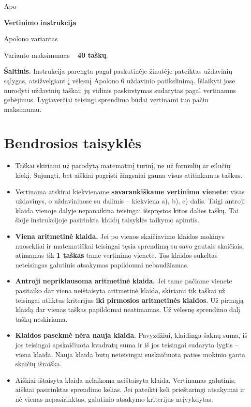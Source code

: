 Apo\documentclass[11pt,a4paper]{article}
\begin{document}
\begin{center}
{\LARGE\bfseries Vertinimo instrukcija}\par
{\large Apolono variantas}\par
Varianto maksimumas -- \textbf{40 taškų}.
\end{center}
\textbf{Šaltinis.} Instrukcija parengta pagal paskutinėje žinutėje pateiktas uždavinių sąlygas, atsižvelgiant į vėlesnį Apolono 6 uždavinio patikslinimą. Išlaikyti jose nurodyti uždavinių taškai; jų vidinis paskirstymas sudarytas pagal vertinamus gebėjimus. Lygiaverčiai teisingi sprendimo būdai vertinami tuo pačiu maksimumu.

\section*{Bendrosios taisyklės}
\begin{itemize}
\item Taškai skiriami už parodytą matematinį turinį, ne už formulių ar eilučių kiekį. Sujungti, bet aiškiai pagrįsti žingsniai gauna visus atitinkamus taškus.
\item Vertinama atskirai kiekviename \textbf{savarankiškame vertinimo vienete}: visas uždavinys, o uždaviniuose su dalimis -- kiekviena a), b), c) dalis. Taigi antroji klaida vienoje dalyje nepanaikina teisingai išspręstos kitos dalies taškų. Tai šioje instrukcijoje pasirinkta klaidų taisyklės taikymo apimtis.
\item \textbf{Viena aritmetinė klaida.} Jei po vienos skaičiavimo klaidos mokinys nuosekliai ir matematiškai teisingai tęsia sprendimą su savo gautais skaičiais, atimamas tik \textbf{1 taškas} tame vertinimo vienete. Tos klaidos sukeltas neteisingas galutinis atsakymas papildomai nebaudžiamas.
\item \textbf{Antroji nepriklausoma aritmetinė klaida.} Jei tame pačiame vienete pasitaiko dar viena neištaisyta aritmetinė klaida, skiriami tik taškai už teisingai atliktus kriterijus \textbf{iki pirmosios aritmetinės klaidos}. Už pirmąją klaidą dar vienas taškas papildomai neatimamas. Už vėlesnę sprendimo dalį taškų neskiriama.
\item \textbf{Klaidos pasekmė nėra nauja klaida.} Pavyzdžiui, klaidinga šaknų suma, iš jos teisingai apskaičiuota kvadratų suma ir iš jos teisingai sudaryta lygtis -- viena klaida. Nauja klaida būtų neteisingai suskaičiuota paties mokinio gauta skaičių išraiška.
\item Aiškiai ištaisyta klaida nelaikoma neištaisyta klaida. Vertinamas galutinis, aiškiai pasirinktas sprendimo kelias. Jei pateikti keli prieštaringi atsakymai ir nė vienas nepasirinktas, galutinio atsakymo kriterijus neįvykdytas.

\end{itemize}
\end{document}
